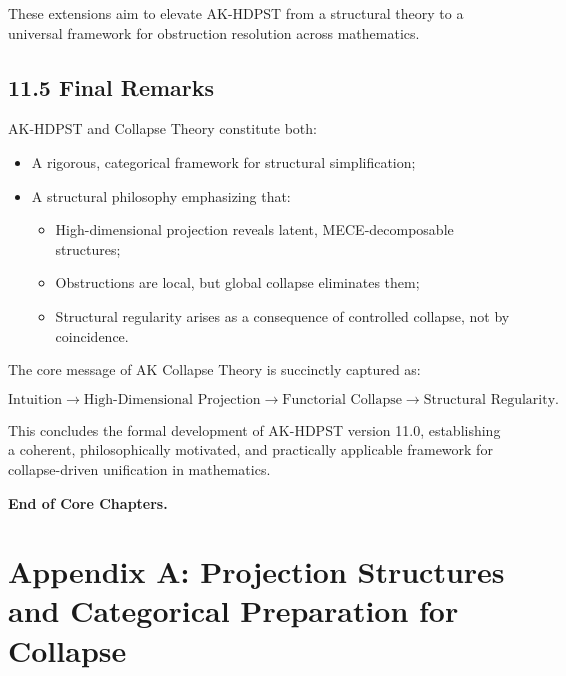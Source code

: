 \documentclass[11pt]{article}
\begin{document}
These extensions aim to elevate AK-HDPST from a structural theory to a universal framework for obstruction resolution across mathematics.

\subsection*{11.5 Final Remarks}

AK-HDPST and Collapse Theory constitute both:

\begin{itemize}
    \item A rigorous, categorical framework for structural simplification;
    \item A structural philosophy emphasizing that:
    \begin{itemize}
        \item High-dimensional projection reveals latent, MECE-decomposable structures;
        \item Obstructions are local, but global collapse eliminates them;
        \item Structural regularity arises as a consequence of controlled collapse, not by coincidence.
    \end{itemize}
\end{itemize}

The core message of AK Collapse Theory is succinctly captured as:

\[
\text{Intuition} \longrightarrow \text{High-Dimensional Projection} \longrightarrow \text{Functorial Collapse} \longrightarrow \text{Structural Regularity}.
\]

This concludes the formal development of AK-HDPST version 11.0, establishing a coherent, philosophically motivated, and practically applicable framework for collapse-driven unification in mathematics.

\vspace{1em}
\noindent\textbf{End of Core Chapters.}



\appendix
\section*{Appendix A: Projection Structures and Categorical Preparation for Collapse}
\end{document}
